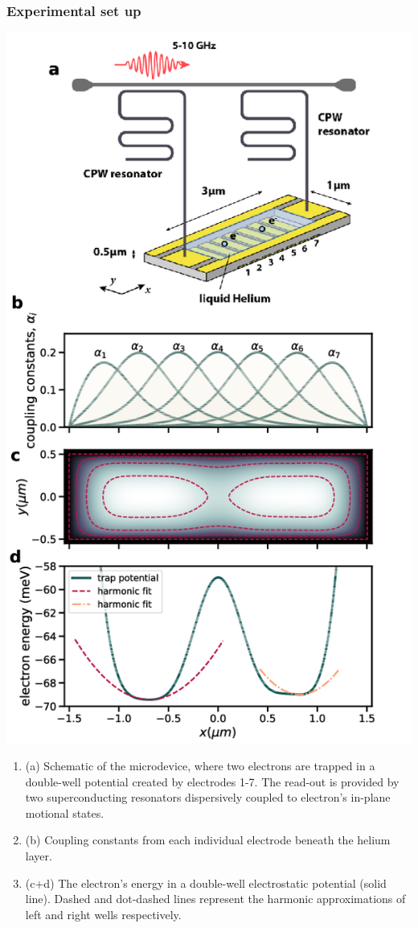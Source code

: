 \documentclass{beamer}
\begin{document}
\begin{frame}
\frametitle{Experimental set up}

\vspace{6mm}

\centerline{\includegraphics[width=0.7\linewidth]{qcfigures/figure1.png}}

\vspace{6mm}

\begin{enumerate}
\item (a) Schematic of the microdevice, where two electrons are trapped in a double-well potential created by electrodes 1-7. The read-out is provided by two superconducting resonators dispersively coupled to  electron's in-plane motional states.

\item (b) Coupling constants from each individual electrode beneath the helium layer.

\item (c+d) The electron's energy in a  double-well electrostatic potential (solid line). Dashed and dot-dashed lines represent the harmonic approximations of left and right wells respectively.
\end{enumerate}

\noindent
\end{frame}
\end{document}
